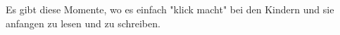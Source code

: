 Es gibt diese Momente, wo es einfach "klick macht" bei den Kindern und sie anfangen zu lesen und zu schreiben.